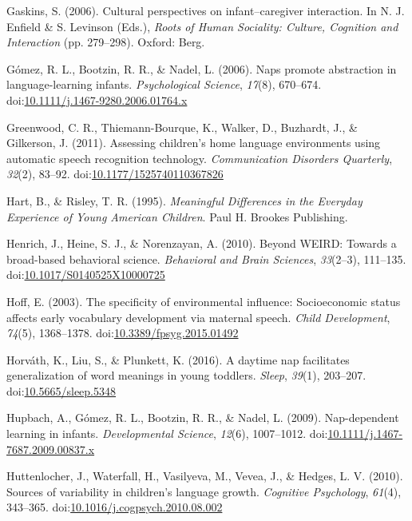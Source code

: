 \documentclass[floatsintext,man]{apa6}
\theoremstyle{definition}
\theoremstyle{definition}
\theoremstyle{definition}
\theoremstyle{remark}
\begin{document}
\hypertarget{ref-gaskins2006cultural}{}
Gaskins, S. (2006). Cultural perspectives on infant--caregiver
interaction. In N. J. Enfield \& S. Levinson (Eds.), \emph{Roots of
Human Sociality: Culture, Cognition and Interaction} (pp. 279--298).
Oxford: Berg.

\hypertarget{ref-gomez2006naps}{}
Gómez, R. L., Bootzin, R. R., \& Nadel, L. (2006). Naps promote
abstraction in language-learning infants. \emph{Psychological Science},
\emph{17}(8), 670--674.
doi:\href{https://doi.org/10.1111/j.1467-9280.2006.01764.x}{10.1111/j.1467-9280.2006.01764.x}

\hypertarget{ref-greenwood2011assessing}{}
Greenwood, C. R., Thiemann-Bourque, K., Walker, D., Buzhardt, J., \&
Gilkerson, J. (2011). Assessing children's home language environments
using automatic speech recognition technology. \emph{Communication
Disorders Quarterly}, \emph{32}(2), 83--92.
doi:\href{https://doi.org/10.1177/1525740110367826}{10.1177/1525740110367826}

\hypertarget{ref-hart1995meaningful}{}
Hart, B., \& Risley, T. R. (1995). \emph{Meaningful Differences in the
Everyday Experience of Young American Children}. Paul H. Brookes
Publishing.

\hypertarget{ref-henrich2010beyond}{}
Henrich, J., Heine, S. J., \& Norenzayan, A. (2010). Beyond WEIRD:
Towards a broad-based behavioral science. \emph{Behavioral and Brain
Sciences}, \emph{33}(2--3), 111--135.
doi:\href{https://doi.org/10.1017/S0140525X10000725}{10.1017/S0140525X10000725}

\hypertarget{ref-hoff2003specificity}{}
Hoff, E. (2003). The specificity of environmental influence:
Socioeconomic status affects early vocabulary development via maternal
speech. \emph{Child Development}, \emph{74}(5), 1368--1378.
doi:\href{https://doi.org/10.3389/fpsyg.2015.01492}{10.3389/fpsyg.2015.01492}

\hypertarget{ref-horvath2016daytime}{}
Horváth, K., Liu, S., \& Plunkett, K. (2016). A daytime nap facilitates
generalization of word meanings in young toddlers. \emph{Sleep},
\emph{39}(1), 203--207.
doi:\href{https://doi.org/10.5665/sleep.5348}{10.5665/sleep.5348}

\hypertarget{ref-hupbach2009nap}{}
Hupbach, A., Gómez, R. L., Bootzin, R. R., \& Nadel, L. (2009).
Nap-dependent learning in infants. \emph{Developmental Science},
\emph{12}(6), 1007--1012.
doi:\href{https://doi.org/10.1111/j.1467-7687.2009.00837.x}{10.1111/j.1467-7687.2009.00837.x}

\hypertarget{ref-huttenlocher2010sources}{}
Huttenlocher, J., Waterfall, H., Vasilyeva, M., Vevea, J., \& Hedges, L.
V. (2010). Sources of variability in children's language growth.
\emph{Cognitive Psychology}, \emph{61}(4), 343--365.
doi:\href{https://doi.org/10.1016/j.cogpsych.2010.08.002}{10.1016/j.cogpsych.2010.08.002}
\end{document}
